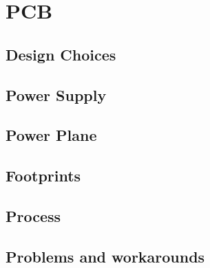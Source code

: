\section{PCB}
\label{sec:pcb}

\subsection{Design Choices}

\subsection{Power Supply}

\subsection{Power Plane}

\subsection{Footprints}

\subsection{Process}

\subsection{Problems and workarounds}
